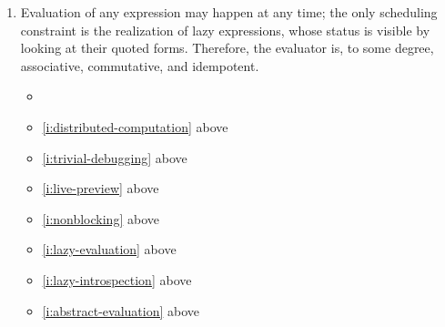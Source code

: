 \documentclass{report}
\makeatletter
\newcommand*{\Label}[2]{%
  \@bsphack
  \begingroup
    \label{#1-original}%
    \def\@currentlabel{#2 [\ref{#1-original}]}%
    \label{#1}%
  \endgroup
  \@esphack
}
\makeatother
\begin{document}
\begin{enumerate}
\item{}\Label{is:evaluation-identities}{eval-identities}
  Evaluation of any expression may happen at any time; the only scheduling
  constraint is the realization of lazy expressions, whose status is
  visible by looking at their quoted forms. Therefore, the evaluator is, to
  some degree, associative, commutative, and idempotent.
\begin{itemize}
\item \initial
\item \ref{i:distributed-computation} above
\item \ref{i:trivial-debugging} above
\item \ref{i:live-preview} above
\item \ref{i:nonblocking} above
\item \ref{i:lazy-evaluation} above
\item \ref{i:lazy-introspection} above
\item \ref{i:abstract-evaluation} above
\end{itemize}


\end{enumerate}
\end{document}
